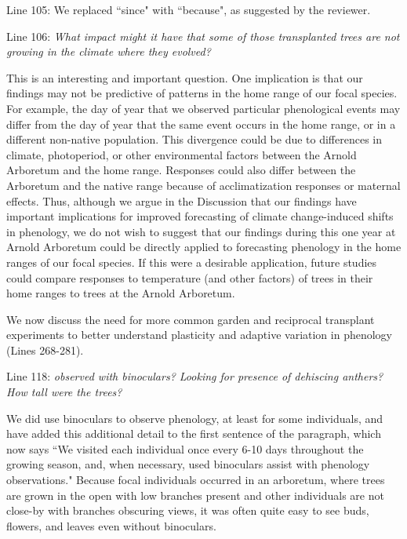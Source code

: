 \documentclass[10.95pt,a4paper]{letter}
\begin{document}
\par Line 105: We replaced ``since" with ``because", as suggested by the reviewer.

\par Line 106: \emph{What impact might it have that some of those transplanted trees are not growing in the climate where they evolved?}
\par This is an interesting and important question. One implication is that our findings may not be predictive of patterns in the home range of our focal species. For example,  the 
day of year that we observed particular phenological events may differ from the day of year that the same event occurs in the home range, or in a different non-native population. This divergence could be due to differences in climate, photoperiod, or other environmental factors between the Arnold Arboretum and the home range. Responses could also differ between the Arboretum and the native range because of acclimatization responses or maternal effects.  Thus, although we argue in the Discussion that our findings have important implications for improved forecasting of climate change-induced shifts in phenology, we do not wish to suggest that our findings during this one year at Arnold Arboretum could be directly applied to forecasting phenology in the home ranges of our focal species. If this were a desirable application, future studies could compare responses to temperature (and other factors) of trees in their home ranges to trees at the Arnold Arboretum. 
\par We now discuss the need for more common garden and reciprocal transplant experiments to better understand plasticity and adaptive variation in phenology (Lines 268-281).

\par Line 118: \emph{observed with binoculars?  Looking for presence of dehiscing anthers? How tall were the trees?}

\par We did use binoculars to observe phenology, at least for some individuals, and have added this additional detail to the first sentence  of the paragraph, which now says  ``We visited each individual once every 6-10 days throughout the growing season, and, when necessary, used binoculars assist with phenology observations." Because focal individuals occurred in an arboretum, where trees are grown in the open with low branches present and other individuals are not close-by with branches obscuring views,  it was often quite easy to see buds, flowers, and leaves even without binoculars. 
\end{document}
